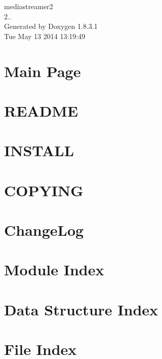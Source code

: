 \documentclass{book}
\begin{document}
\begin{titlepage}
\vspace*{7cm}
\begin{center}
{\Large mediastreamer2 \\[1ex]\large 2.. }\\
\vspace*{1cm}
{\large Generated by Doxygen 1.8.3.1}\\
\vspace*{0.5cm}
{\small Tue May 13 2014 13:19:49}\\
\end{center}
\end{titlepage}
\clearemptydoublepage
{}
\tableofcontents
\clearemptydoublepage
{}
\chapter{Main Page}
\label{index}
\chapter{R\-E\-A\-D\-M\-E}
\label{mediastreamer2_readme}

\chapter{I\-N\-S\-T\-A\-L\-L}
\label{mediastreamer2_install}

\chapter{C\-O\-P\-Y\-I\-N\-G}
\label{mediastreamer2_license}

\chapter{Change\-Log}
\label{mediastreamer2_changelog}

\chapter{Module Index}

\chapter{Data Structure Index}

\chapter{File Index}

\end{document}
